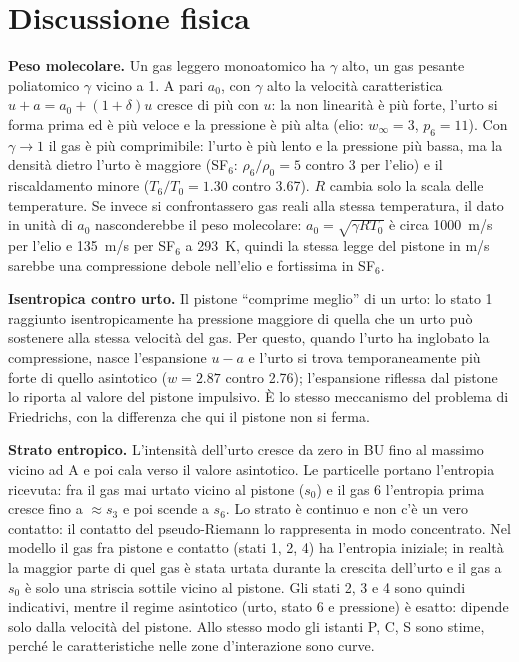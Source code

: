 \documentclass[11pt,a4paper]{article}
\newcommand{\uma}{u-a}
\begin{document}
\section{Discussione fisica}
\textbf{Peso molecolare.} Un gas leggero monoatomico ha $\gamma$ alto, un gas pesante poliatomico $\gamma$ vicino a 1.
A pari $a_0$, con $\gamma$ alto la velocità caratteristica $u+a=a_0+(1+\delta)u$ cresce di più con $u$: la non
linearità è più forte, l'urto si forma prima ed è più veloce e la pressione è più alta (elio: $w_\infty=3$,
$p_6=11$). Con $\gamma\to1$ il gas è più comprimibile: l'urto è più lento e la pressione più bassa, ma la densità
dietro l'urto è maggiore (SF$_6$: $\rho_6/\rho_0=5$ contro 3 per l'elio) e il riscaldamento minore
($T_6/T_0=\num{1.30}$ contro \num{3.67}). $R$ cambia solo la scala delle temperature. Se invece si confrontassero
gas reali alla stessa temperatura, il dato in unità di $a_0$ nasconderebbe il peso molecolare:
$a_0=\sqrt{\gamma RT_0}$ è circa \SI{1000}{m/s} per l'elio e \SI{135}{m/s} per SF$_6$ a \SI{293}{K}, quindi la
stessa legge del pistone in m/s sarebbe una compressione debole nell'elio e fortissima in SF$_6$.

\textbf{Isentropica contro urto.} Il pistone ``comprime meglio'' di un urto: lo stato 1 raggiunto isentropicamente
ha pressione maggiore di quella che un urto può sostenere alla stessa velocità del gas. Per questo, quando l'urto
ha inglobato la compressione, nasce l'espansione $\uma$ e l'urto si trova temporaneamente più forte di quello
asintotico ($w=\num{2.87}$ contro \num{2.76}); l'espansione riflessa dal pistone lo riporta al valore del pistone
impulsivo. È lo stesso meccanismo del problema di Friedrichs, con la differenza che qui il pistone non si ferma.

\textbf{Strato entropico.} L'intensità dell'urto cresce da zero in BU fino al massimo vicino ad A e poi cala verso
il valore asintotico. Le particelle portano l'entropia ricevuta: fra il gas mai urtato vicino al pistone ($s_0$) e
il gas 6 l'entropia prima cresce fino a $\approx s_3$ e poi scende a $s_6$. Lo strato è continuo e non c'è un
vero contatto: il contatto del pseudo-Riemann lo rappresenta in modo concentrato. Nel modello il gas fra pistone e
contatto (stati 1, 2, 4) ha l'entropia iniziale; in realtà la maggior parte di quel gas è stata urtata durante la
crescita dell'urto e il gas a $s_0$ è solo una striscia sottile vicino al pistone. Gli stati 2, 3 e 4 sono quindi
indicativi, mentre il regime asintotico (urto, stato 6 e pressione) è esatto: dipende solo dalla velocità del
pistone. Allo stesso modo gli istanti P, C, S sono stime, perché le caratteristiche nelle zone d'interazione sono
curve.
\end{document}
